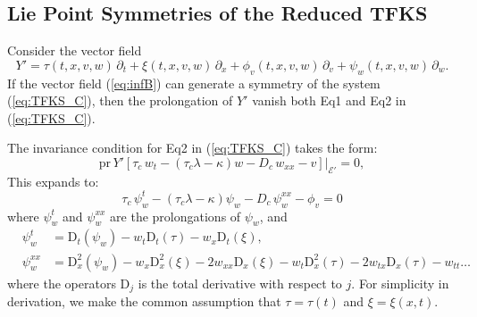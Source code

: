 \documentclass{article}
\begin{document}
\subsection{Lie Point Symmetries of the Reduced TFKS}
\par 
Consider the vector field
\begin{equation}\label{eq:infB}
Y' = \tau(t,x,v,w)\,\partial_t + \xi(t,x,v,w)\,\partial_x + \phi_v(t,x,v,w)\,\partial_v + \psi_w(t,x,v,w)\,\partial_w.
\end{equation}
If the vector field (\ref{eq:infB}) can generate a symmetry of the system (\ref{eq:TFKS_C}), then the prolongation of $Y'$ vanish both Eq1 and Eq2 in (\ref{eq:TFKS_C}).
\par 
The invariance condition for Eq2 in (\ref{eq:TFKS_C}) takes the form:
\begin{equation*}\label{eq:inf3}
\mathrm{pr}\,Y' \left[ \tau_c\,w_t - (\tau_c\lambda - \kappa) w - D_c\,w_{xx} - v \right] \Bigg|_{\mathcal{E}'} = 0,
\end{equation*}
This expands to:
\begin{equation}\label{eq:infB2}
\tau_c\,\psi_w^t - (\tau_c\lambda - \kappa) \psi_w - D_c\,\psi_w^{xx} - \phi_v = 0
\end{equation}
 where $\psi_w^t$ and $\psi_w^{xx}$ are the prolongations of $\psi_w$, and
\begin{eqnarray*}
&\psi_w^t &= \mathrm{D}_t(\psi_w) - w_t \mathrm{D}_t(\tau) - w_x \mathrm{D}_t(\xi),\nonumber\\
&\psi_w^{xx} &= \mathrm{D}_x^2(\psi_w) - w_x \mathrm{D}_x^2(\xi) - 2 w_{xx} \mathrm{D}_x(\xi) - w_t \mathrm{D}_x^2(\tau) - 2 w_{tx} \mathrm{D}_x(\tau) - w_{tt} \dots \nonumber
\end{eqnarray*}
where the operators $\mathrm{D}_j$ is the total derivative with respect to $j$. For simplicity in derivation, we make the common assumption that $\tau = \tau(t)$ and $\xi = \xi(x,t)$.
\par 
\end{document}

